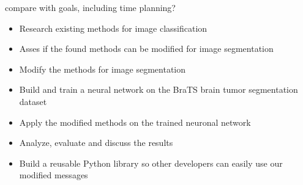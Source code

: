 compare with goals, including time planning?

\begin{itemize}
\item Research existing methods for image classification
\item Asses if the found methods can be modified for image segmentation
\item Modify the methods for image segmentation
\item Build and train a neural network on the BraTS brain tumor segmentation dataset
\item Apply the modified methods on the trained neuronal network
\item Analyze, evaluate and discuss the results
\item Build a reusable Python library so other developers can easily use our modified messages
\end{itemize}
